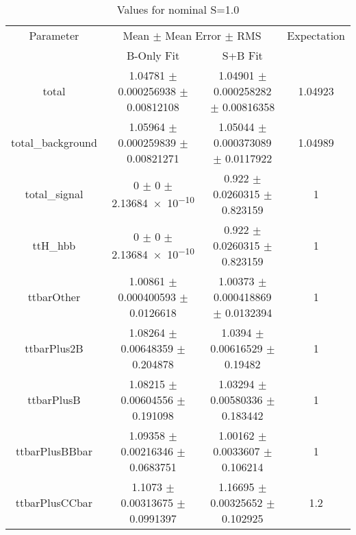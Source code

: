 \begin{table}
\centering
\caption{Values for nominal S=1.0}
\begin{tabular}{cccc}
\toprule
Parameter & \multicolumn{2}{c}{Mean $\pm$ Mean Error $\pm$ RMS} & Expectation\\
 & B-Only Fit & S+B Fit & \\
\midrule
total & \num{1.04781} $\pm$ \num{0.000256938} $\pm$ \num{0.00812108} & \num{1.04901} $\pm$ \num{0.000258282} $\pm$ \num{0.00816358} & \num{1.04923}\\
total\_background & \num{1.05964} $\pm$ \num{0.000259839} $\pm$ \num{0.00821271} & \num{1.05044} $\pm$ \num{0.000373089} $\pm$ \num{0.0117922} & \num{1.04989}\\
total\_signal & \num{0} $\pm$ \num{0} $\pm$ \num{2.13684e-10} & \num{0.922} $\pm$ \num{0.0260315} $\pm$ \num{0.823159} & \num{1}\\
ttH\_hbb & \num{0} $\pm$ \num{0} $\pm$ \num{2.13684e-10} & \num{0.922} $\pm$ \num{0.0260315} $\pm$ \num{0.823159} & \num{1}\\
ttbarOther & \num{1.00861} $\pm$ \num{0.000400593} $\pm$ \num{0.0126618} & \num{1.00373} $\pm$ \num{0.000418869} $\pm$ \num{0.0132394} & \num{1}\\
ttbarPlus2B & \num{1.08264} $\pm$ \num{0.00648359} $\pm$ \num{0.204878} & \num{1.0394} $\pm$ \num{0.00616529} $\pm$ \num{0.19482} & \num{1}\\
ttbarPlusB & \num{1.08215} $\pm$ \num{0.00604556} $\pm$ \num{0.191098} & \num{1.03294} $\pm$ \num{0.00580336} $\pm$ \num{0.183442} & \num{1}\\
ttbarPlusBBbar & \num{1.09358} $\pm$ \num{0.00216346} $\pm$ \num{0.0683751} & \num{1.00162} $\pm$ \num{0.0033607} $\pm$ \num{0.106214} & \num{1}\\
ttbarPlusCCbar & \num{1.1073} $\pm$ \num{0.00313675} $\pm$ \num{0.0991397} & \num{1.16695} $\pm$ \num{0.00325652} $\pm$ \num{0.102925} & \num{1.2}\\
\bottomrule
\end{tabular}
\end{table}